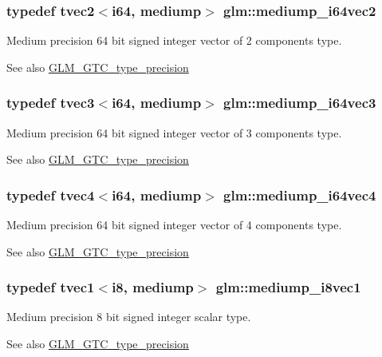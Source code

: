 \subsubsection[{mediump\+\_\+i64vec2}]{\setlength{\rightskip}{0pt plus 5cm}typedef tvec2$<${\bf i64}, mediump$>$ {\bf glm\+::mediump\+\_\+i64vec2}}\label{namespaceglm_ac9b4b83ee34df1f21f6dbfc5746e8177}
Medium precision 64 bit signed integer vector of 2 components type. \begin{DoxySeeAlso}{See also}
\hyperlink{group__gtc__type__precision}{G\+L\+M\+\_\+\+G\+T\+C\+\_\+type\+\_\+precision} 
\end{DoxySeeAlso}
\hypertarget{namespaceglm_a19680633964fb57e619bdf1d01b21115}{}
\subsubsection[{mediump\+\_\+i64vec3}]{\setlength{\rightskip}{0pt plus 5cm}typedef tvec3$<${\bf i64}, mediump$>$ {\bf glm\+::mediump\+\_\+i64vec3}}\label{namespaceglm_a19680633964fb57e619bdf1d01b21115}
Medium precision 64 bit signed integer vector of 3 components type. \begin{DoxySeeAlso}{See also}
\hyperlink{group__gtc__type__precision}{G\+L\+M\+\_\+\+G\+T\+C\+\_\+type\+\_\+precision} 
\end{DoxySeeAlso}
\hypertarget{namespaceglm_acb96f56ac9a42f39ca90209cfd557a26}{}
\subsubsection[{mediump\+\_\+i64vec4}]{\setlength{\rightskip}{0pt plus 5cm}typedef tvec4$<${\bf i64}, mediump$>$ {\bf glm\+::mediump\+\_\+i64vec4}}\label{namespaceglm_acb96f56ac9a42f39ca90209cfd557a26}
Medium precision 64 bit signed integer vector of 4 components type. \begin{DoxySeeAlso}{See also}
\hyperlink{group__gtc__type__precision}{G\+L\+M\+\_\+\+G\+T\+C\+\_\+type\+\_\+precision} 
\end{DoxySeeAlso}
\hypertarget{namespaceglm_aa849ad5e796d74e0fb09cb62e7ef8d86}{}
\subsubsection[{mediump\+\_\+i8vec1}]{\setlength{\rightskip}{0pt plus 5cm}typedef tvec1$<${\bf i8}, mediump$>$ {\bf glm\+::mediump\+\_\+i8vec1}}\label{namespaceglm_aa849ad5e796d74e0fb09cb62e7ef8d86}
Medium precision 8 bit signed integer scalar type. \begin{DoxySeeAlso}{See also}
\hyperlink{group__gtc__type__precision}{G\+L\+M\+\_\+\+G\+T\+C\+\_\+type\+\_\+precision} 
\end{DoxySeeAlso}
\hypertarget{namespaceglm_afb2f4e62d3b4e1da13ef6d6c891647cb}{}
